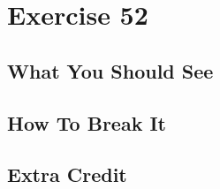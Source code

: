 \chapter{Exercise 52}


\section{What You Should See}


\section{How To Break It}


\section{Extra Credit}



